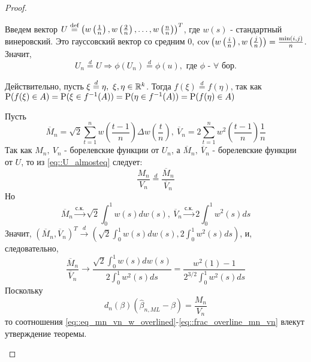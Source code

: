 \begin{proof}
\begin{enumerate}
        Введем вектор $U\defeq\left(w\left(\frac{1}{n}\right),w\left(\frac{2}{n}\right),\ldots,w\left(\frac{n}{n}\right)\right)^T$,
        где $w(s)$ - стандартный винеровский. Это гауссовский вектор со средним 0,
        $\cov\left(w\left(\frac{i}{n}\right),w\left(\frac{j}{n}\right)\right)=\frac{\min(i,j)}{n}$.
        Значит,
        \begin{equation}\label{eq::U_almosteq}
            U_n\overset{d}{=}U \Rightarrow \phi(U_n)\overset{d}{=}\phi(u),\text{ где $\phi$ - $\forall$ бор.}
        \end{equation}
        \begin{leftbar}
            Действительно, пусть $\xi\overset{d}{=}\eta,\ \xi,\eta\in\R^k$. Тогда $f(\xi)\overset{d}{=}f(\eta)$,
            так как $\P(f(\xi)\in A)=\P(\xi\in f^{-1}(A))=\P(\eta\in f^{-1}(A))=\P(f(\eta)\in A)$
        \end{leftbar}
        Пусть
        \[\overline{M}_n=\sqrt{2}\sum_{t=1}^nw\left(\frac{t-1}{n}\right)\Delta w\left(\frac{t}{n}\right),\ \overline{V}_n=2\sum_{t=1}^nw^2\left(\frac{t-1}{n}\right)\frac{1}{n}\]
        Так как $M_n,\ V_n$ - борелевские функции от $U_n$, а $\overline{M}_n,\ \overline{V}_n$ - борелевские функции от $U$,
        то из \eqref{eq::U_almosteq} следует:
        \begin{equation}\label{eq::eq_mn_vn_w_overlined}
            \frac{M_n}{V_n}\overset{d}{=}\frac{\overline{M}_n}{\overline{V}_n}
        \end{equation}
        Но
        \[\overline{M}_n\xrightarrow{\text{с.к.}}\sqrt{2}\int_0^1w(s)dw(s),\ \overline{V}_n\xrightarrow{\text{с.к.}}2\int_0^1w^2(s)ds\]
        Значит, $(\overline{M}_n,\overline{V}_n)^T\xrightarrow{d}\left(\sqrt{2}\int_0^1w(s)dw(s), 2\int_0^1w^2(s)ds\right)$,
        и, следовательно,
        \begin{equation}\label{eq::frac_overline_mn_vn}
            \frac{\overline{M}_n}{\overline{V}_n}\rightarrow\frac{\sqrt{2}\int_0^1w(s)dw(s)}{2\int_0^1w^2(s)ds}=\frac{w^2(1)-1}{2^{3/2}\int^1_0w^2(s)ds}
        \end{equation}
        Поскольку
        \[d_n(\beta)(\widehat{\beta}_{n,ML}-\beta)=\frac{M_n}{V_n}\]
        то соотношения \eqref{eq::eq_mn_vn_w_overlined}-\eqref{eq::frac_overline_mn_vn} влекут утверждение
        теоремы.
    \end{enumerate}
\end{proof}

